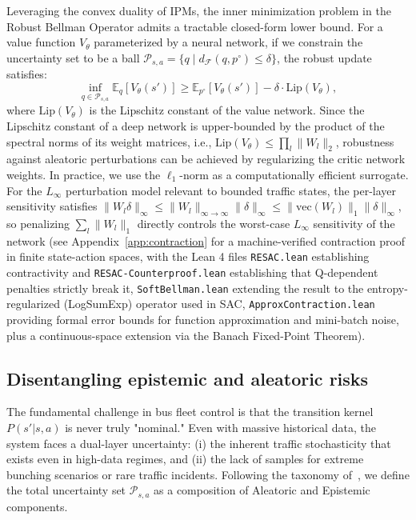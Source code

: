 \documentclass[10pt]{article}
\begin{document}
Leveraging the convex duality of IPMs, the inner minimization problem in the Robust Bellman Operator admits a tractable closed-form lower bound. For a value function $V_\theta$ parameterized by a neural network, if we constrain the uncertainty set to be a ball $\mathcal{P}_{s,a} = \{ q \mid d_{\mathcal{F}}(q, p^\circ) \le \delta \}$, the robust update satisfies:
\begin{equation}
    \inf_{q \in \mathcal{P}_{s,a}} \mathbb{E}_{q} [V_\theta(s')] \ge \mathbb{E}_{p^\circ} [V_\theta(s')] - \delta \cdot \text{Lip}(V_\theta),
    \label{eq:robust_lower_bound}
\end{equation}
where $\text{Lip}(V_\theta)$ is the Lipschitz constant of the value network. Since the Lipschitz constant of a deep network is upper-bounded by the product of the spectral norms of its weight matrices, i.e., $\text{Lip}(V_\theta) \le \prod_l \|W_l\|_2$, robustness against aleatoric perturbations can be achieved by regularizing the critic network weights. In practice, we use the $\ell_1$-norm as a computationally efficient surrogate. For the $L_\infty$ perturbation model relevant to bounded traffic states, the per-layer sensitivity satisfies $\|W_l \delta\|_\infty \le \|W_l\|_{\infty\to\infty}\|\delta\|_\infty \le \|\text{vec}(W_l)\|_1 \|\delta\|_\infty$, so penalizing $\sum_l \|W_l\|_1$ directly controls the worst-case $L_\infty$ sensitivity of the network (see Appendix~\ref{app:contraction} for a machine-verified contraction proof in finite state-action spaces, with the Lean 4 files \texttt{RESAC.lean} establishing contractivity and \texttt{RESAC-Counterproof.lean} establishing that Q-dependent penalties strictly break it, \texttt{SoftBellman.lean} extending the result to the entropy-regularized (LogSumExp) operator used in SAC, \texttt{ApproxContraction.lean} providing formal error bounds for function approximation and mini-batch noise, plus a continuous-space extension via the Banach Fixed-Point Theorem).

\subsection{Disentangling epistemic and aleatoric risks}
The fundamental challenge in bus fleet control is that the transition kernel $P(s'|s,a)$ is never truly "nominal." Even with massive historical data, the system faces a dual-layer uncertainty: (i) the inherent traffic stochasticity that exists even in high-data regimes, and (ii) the lack of samples for extreme bunching scenarios or rare traffic incidents. Following the taxonomy of~\cite{Clements2019EstimatingRisk, Depeweg2018Decomposition}, we define the total uncertainty set $\mathcal{P}_{s,a}$ as a composition of Aleatoric and Epistemic components.
\end{document}

